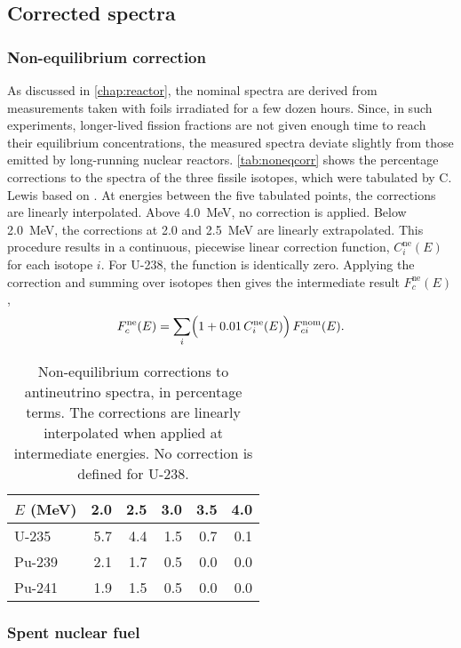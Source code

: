 \documentclass[../thesis.tex]{subfiles}
\begin{document}
\subsection{Corrected spectra}
\label{sec:corrspectra}

\subsubsection{Non-equilibrium correction}
\label{sec:noneqcorrspectra}

As discussed in \autoref{chap:reactor}, the nominal spectra are derived from measurements taken with foils irradiated for a few dozen hours. Since, in such experiments, longer-lived fission fractions are not given enough time to reach their equilibrium concentrations, the measured spectra deviate slightly from those emitted by long-running nuclear reactors. \autoref{tab:noneqcorr} shows the percentage corrections to the spectra of the three fissile isotopes, which were tabulated by C. Lewis \cite{Lewis} based on \cite{Mueller_2011}. At energies between the five tabulated points, the corrections are linearly interpolated. Above 4.0~MeV, no correction is applied. Below 2.0~MeV, the corrections at 2.0 and 2.5~MeV are linearly extrapolated. This procedure results in a continuous, piecewise linear correction function, $C^\mathrm{ne}_i(E)$ for each isotope $i$. For U-238, the function is identically zero. Applying the correction and summing over isotopes then gives the intermediate result $F^\mathrm{ne}_c(E)$,
\[ F^\mathrm{ne}_c(E) = \sum_i \Bigl(1 + 0.01\, C^\mathrm{ne}_i(E)\Bigr)\,
  F^\mathrm{nom}_{ci}(E). \]

\begin{table}
  \centering
  \begin{tabular}{lrrrrr}
    \toprule
    $E$ (MeV) & 2.0 & 2.5 & 3.0 & 3.5 & 4.0 \\
    \midrule
    U-235 & 5.7 & 4.4 & 1.5 & 0.7 & 0.1 \\
    Pu-239 & 2.1 & 1.7 & 0.5 & 0.0 & 0.0 \\
    Pu-241 & 1.9 & 1.5 & 0.5 & 0.0 & 0.0 \\
    \bottomrule
  \end{tabular}
  \caption{Non-equilibrium corrections to antineutrino spectra, in percentage terms. The corrections are linearly interpolated when applied at intermediate energies. No correction is defined for U-238.}
  \label{tab:noneqcorr}
\end{table}

\subsubsection{Spent nuclear fuel}
\label{sec:snfcorrspectra}
\end{document}
